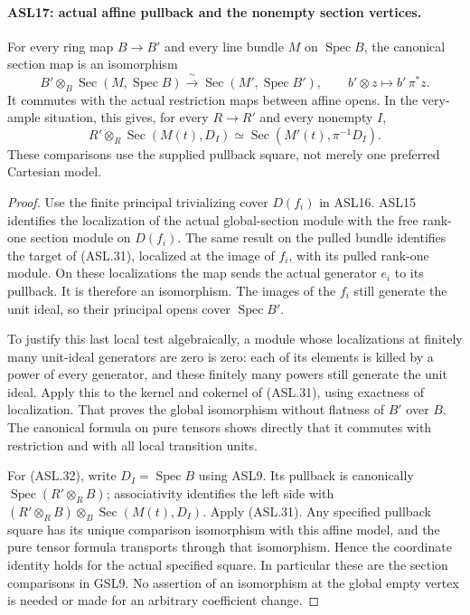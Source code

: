 \documentclass[11pt,a4paper]{article}
\numberwithin{equation}{section}
\theoremstyle{remark}\newtheorem{remark}[theorem]{Remark}
\begin{document}
\paragraph{ASL17: actual affine pullback and the nonempty section vertices.}
\label{claim:ASL17}
For every ring map $B\to B'$ and every line bundle $M$ on
$\operatorname{Spec}B$, the canonical section map is an isomorphism
\[
 B'\otimes_B\operatorname{Sec}(M,\operatorname{Spec}B)
       \xrightarrow{\ \sim\ }
       \operatorname{Sec}(M',\operatorname{Spec}B'),
 \qquad b'\otimes z\longmapsto b'\,\pi^*z.          \tag{ASL.31}
\]
It commutes with the actual restriction maps between affine
opens.  In the very-ample situation, this gives, for every
$R\to R'$ and every nonempty $I$,
\[
 R'\otimes_R\operatorname{Sec}(M(t),D_I)
       \simeq\operatorname{Sec}(M'(t),\pi^{-1}D_I).
                                                        \tag{ASL.32}
\]
These comparisons use the supplied pullback square, not merely
one preferred Cartesian model.

\begin{proof}
Use the finite principal trivializing cover $D(f_i)$ in ASL16.
ASL15 identifies the localization of the actual global-section
module with the free rank-one section module on $D(f_i)$.
The same result on the pulled bundle identifies the target of
(ASL.31), localized at the image of $f_i$, with its pulled
rank-one module.  On these localizations the map sends the
actual generator $e_i$ to its pullback.  It is therefore an
isomorphism.  The images of the $f_i$ still generate the unit
ideal, so their principal opens cover $\operatorname{Spec}B'$.

To justify this last local test algebraically, a module whose
localizations at finitely many unit-ideal generators are zero
is zero: each of its elements is killed by a power of every
generator, and these finitely many powers still generate the
unit ideal.  Apply this to the kernel and cokernel of (ASL.31),
using exactness of localization.  That proves the global
isomorphism without flatness of $B'$ over $B$.
The canonical formula on pure tensors shows directly that
it commutes with restriction and with all local transition units.

For (ASL.32), write $D_I=\operatorname{Spec}B$ using ASL9.
Its pullback is canonically
$\operatorname{Spec}(R'\otimes_RB)$; associativity identifies
the left side with
$(R'\otimes_RB)\otimes_B\operatorname{Sec}(M(t),D_I)$.
Apply (ASL.31).  Any specified pullback square has its unique
comparison isomorphism with this affine model, and the pure
tensor formula transports through that isomorphism.  Hence the
coordinate identity holds for the actual specified square.
In particular these are the section comparisons in GSL9.
No assertion of an isomorphism at the global empty vertex is
needed or made for an arbitrary coefficient change.
\end{proof}
\end{document}
